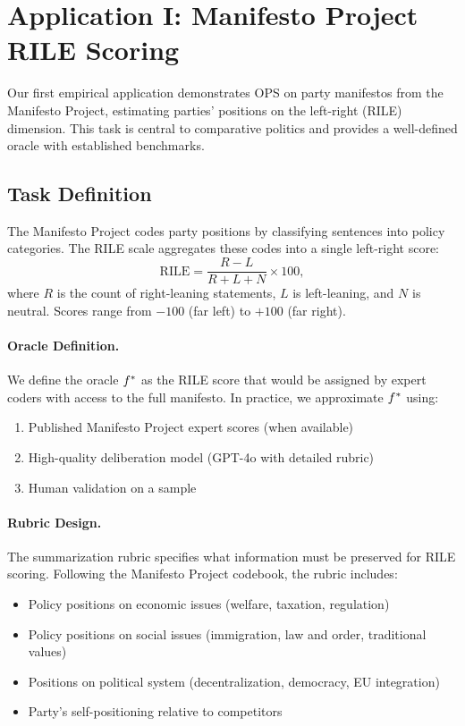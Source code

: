 \section{Application I: Manifesto Project RILE Scoring}\label{sec:manifesto}

Our first empirical application demonstrates OPS on party manifestos from the Manifesto Project, estimating parties' positions on the left-right (RILE) dimension. This task is central to comparative politics and provides a well-defined oracle with established benchmarks.

\subsection{Task Definition}

The Manifesto Project \citep{manifesto2021} codes party positions by classifying sentences into policy categories. The RILE scale aggregates these codes into a single left-right score:
\[
\text{RILE} = \frac{R - L}{R + L + N} \times 100,
\]
where $R$ is the count of right-leaning statements, $L$ is left-leaning, and $N$ is neutral. Scores range from $-100$ (far left) to $+100$ (far right).

\paragraph{Oracle Definition.}
We define the oracle $f^{\ast}$ as the RILE score that would be assigned by expert coders with access to the full manifesto. In practice, we approximate $f^{\ast}$ using:
\begin{enumerate}[nosep]
    \item Published Manifesto Project expert scores (when available)
    \item High-quality deliberation model (GPT-4o with detailed rubric)
    \item Human validation on a sample
\end{enumerate}

\paragraph{Rubric Design.}
The summarization rubric specifies what information must be preserved for RILE scoring. Following the Manifesto Project codebook, the rubric includes:
\begin{itemize}[nosep]
    \item Policy positions on economic issues (welfare, taxation, regulation)
    \item Policy positions on social issues (immigration, law and order, traditional values)
    \item Positions on political system (decentralization, democracy, EU integration)
    \item Party's self-positioning relative to competitors
\end{itemize}

